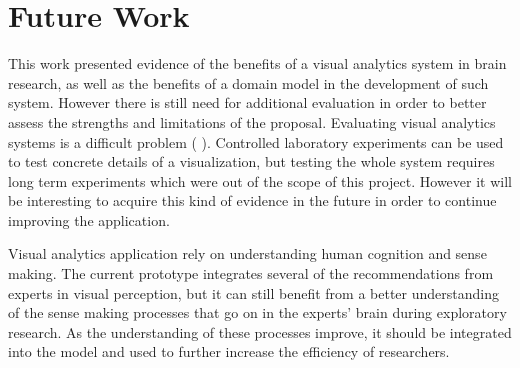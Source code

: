 
\section{Future Work}

This work presented evidence of the benefits of a visual analytics system in brain research, as well as the benefits of a domain model in the development of such system. However there is still need for additional evaluation in order to better assess the strengths and limitations of the proposal. Evaluating visual analytics systems is a difficult problem (\autocite{cook_illuminating_2005, shneiderman_strategies_2006,lam_seven_2011} ). Controlled laboratory experiments can be used to test concrete details of a visualization, but testing the whole system requires long term experiments which were out of the scope of this project. However it will be interesting to acquire this kind of evidence in the future in order to continue improving the application.

Visual analytics application rely on understanding human cognition and sense making. The current prototype integrates several of the recommendations from experts in visual perception, but it can still benefit from a better understanding of the sense making processes that go on in the experts' brain during exploratory research. As the understanding of these processes improve, it should be integrated into the model and used to further increase the efficiency of researchers.


